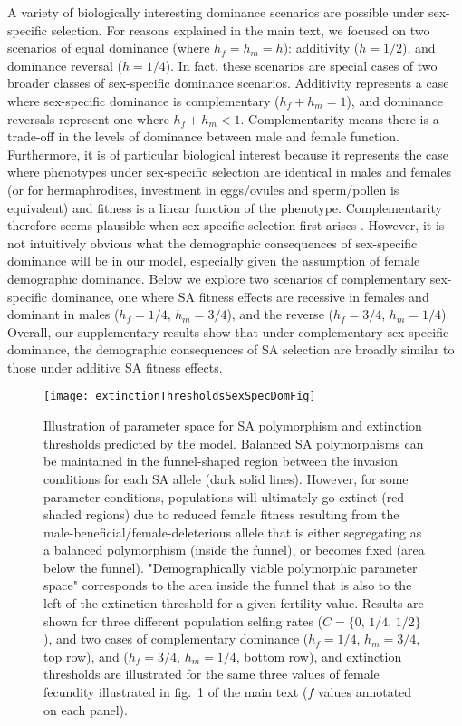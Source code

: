\documentclass[11pt]{article}
\begin{document}
A variety of biologically interesting dominance scenarios are possible under sex-specific selection. For reasons explained in the main text, we focused on two scenarios of equal dominance (where $h_f = h_m = h$): additivity ($h = 1/2$), and dominance reversal ($h = 1/4$). In fact, these scenarios are special cases of two broader classes of sex-specific dominance scenarios. Additivity represents a case where sex-specific dominance is complementary ($h_f + h_m = 1$), and dominance reversals represent one where $h_f + h_m < 1$. Complementarity means there is a trade-off in the levels of dominance between male and female function. Furthermore, it is of particular biological interest because it represents the case where phenotypes under sex-specific selection are identical in males and females (or for hermaphrodites, investment in eggs/ovules and sperm/pollen is equivalent) and fitness is a linear function of the phenotype. Complementarity therefore seems plausible when sex-specific selection first arises \citep{SpencerPriest2016}. However, it is not intuitively obvious what the demographic consequences of sex-specific dominance will be in our model, especially given the assumption of female demographic dominance. Below we explore two scenarios of complementary sex-specific dominance, one where SA fitness effects are recessive in females and dominant in males ($h_f = 1/4$, $h_m = 3/4$), and the reverse ($h_f = 3/4$, $h_m = 1/4$). Overall, our supplementary results show that under complementary sex-specific dominance, the demographic consequences of SA selection are broadly similar to those under additive SA fitness effects.



 \begin{figure}[htbp]
 \centering
 \texttt{[image: extinctionThresholdsSexSpecDomFig]}
 \caption{\footnotesize{Illustration of parameter space for SA polymorphism and extinction thresholds predicted by the model. Balanced SA polymorphisms can be maintained in the funnel-shaped region between the invasion conditions for each SA allele (dark solid lines). However, for some parameter conditions, populations will ultimately go extinct (red shaded regions) due to reduced female fitness resulting from the male-beneficial/female-deleterious allele that is either segregating as a balanced polymorphism (inside the funnel), or becomes fixed (area below the funnel). "Demographically viable polymorphic parameter space" corresponds to the area inside the funnel that is also to the left of the extinction threshold for a given fertility value. Results are shown for three different population selfing rates ($C = \{0,\,1/4,\,1/2\}$), and two cases of complementary dominance ($h_f = 1/4$, $h_m = 3/4$, top row), and ($h_f = 3/4$, $h_m = 1/4$, bottom row), and extinction thresholds are illustrated for the same three values of female fecundity illustrated in fig.~1 of the main text ($f$ values annotated on each panel).}}
 \label{fig:extThresholdsCompSexSpec}
 \end{figure}
\end{document}
